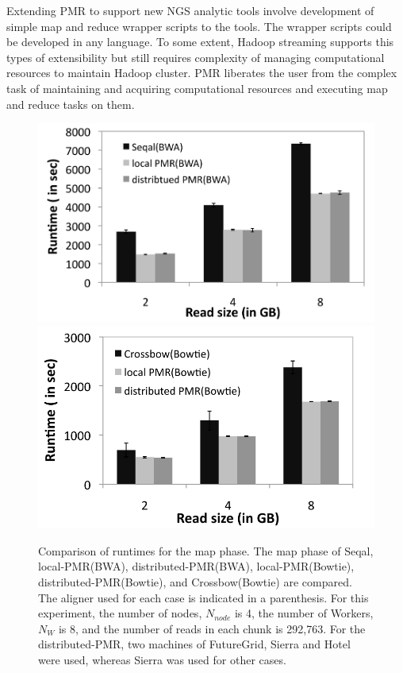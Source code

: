 \documentclass[12pt]{report}
\begin{document}
Extending PMR to support new NGS analytic tools involve development of
simple map and reduce wrapper scripts to the tools. The wrapper
scripts could be developed in any language.  To some extent, Hadoop streaming supports
this types of extensibility but still requires complexity of managing
computational resources to maintain Hadoop cluster.  PMR liberates the
user from the complex task of maintaining and acquiring computational
resources and executing map and reduce tasks on them.


\begin{figure} 
 \centering
\includegraphics[scale=0.54]{figures/seqal_lpmr_dpmr.pdf}
\includegraphics[scale=0.59]{figures/cb_lpmr_dpmr.pdf}
\caption{\small  Comparison of runtimes for the map phase. The map phase of Seqal, local-PMR(BWA), distributed-PMR(BWA), local-PMR(Bowtie), distributed-PMR(Bowtie), and Crossbow(Bowtie) are compared.  The aligner used for each case is indicated in a parenthesis.  For this experiment, the number of nodes, $N_{node}$ is 4, the number of Workers, $N_W$ is 8, and the number of reads in each chunk is 292,763.  For the distributed-PMR, two machines of FutureGrid, Sierra and Hotel were used, whereas Sierra was used for other cases.}
  \label{fig:tool_comp} 
\end{figure}
\end{document}
